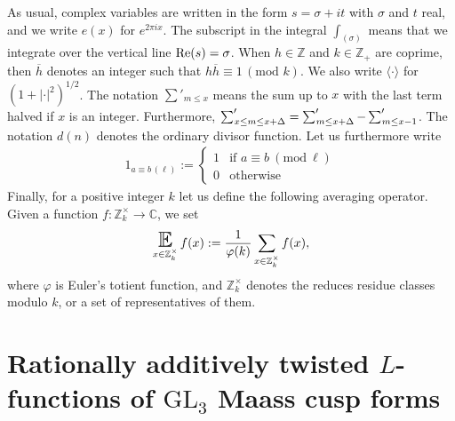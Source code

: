 \documentclass[a4paper,10pt,twoside]{amsart}
\theoremstyle{definition}
\numberwithin{equation}{section}
\newcommand\E{\mathbb{E}}
\renewcommand{\Re}{\textnormal{Re}}
\renewcommand{\pmod}[1]{\ (\mathrm{mod}\ #1)}
\renewcommand\:{\colon}
\newcommand{\sump}{\mathop{{\sum}^{\raisebox{-3pt}{\makebox[0pt][l]{$'$}}}}}
\begin{document}
As usual, complex variables are written in the form $s=\sigma+it$ with $\sigma$ and $t$ real, and we write $e(x)$ for $e^{2\pi ix}$. The subscript in the integral $\int_{(\sigma)}$ means that we integrate over the vertical line $\Re(s)=\sigma$. When $h\in\mathbb Z$ and $k\in\mathbb Z_+$ are coprime, then $\overline h$ denotes an integer such that $h\overline h\equiv 1\,(\text{mod }k)$. We also write $\langle \cdot\rangle$ for $(1+|\cdot|^2)^{1/2}$. The notation $\sum'_{m\leqslant x}$ means the sum up to $x$ with the last term halved if $x$ is an integer. Furthermore, $\sump_{x\leq m\leq x+\Delta}=\sump_{m\leq x+\Delta}-\sump_{m\leq x-1}$. The notation $d(n)$ denotes the ordinary divisor function. Let us furthermore write
\begin{align*}
1_{a\equiv b\,(\ell)}:=\begin{cases}
1&\text{if }a\equiv b\pmod\ell\\
0&\text{otherwise}
\end{cases}
\end{align*}
Finally, for a positive integer $k$ let us define the following averaging operator. Given a function $f\colon\mathbb Z_k^\times\longrightarrow\mathbb C$, we set 
\begin{align*}
\mathop{\text{\LARGE$\E$}}_{x\in\mathbb Z_k^\times}
f(x):=\frac1{\varphi(k)}\sum_{x\in\mathbb Z_k^\times}f(x),
\end{align*}
where $\varphi$ is Euler's totient function, and $\mathbb Z_k^\times$ denotes the reduces residue classes modulo $k$, or a set of representatives of them.

\section{Rationally additively twisted $L$-functions of $\mathrm{GL}_3$ Maass cusp forms}
    
\end{document}
